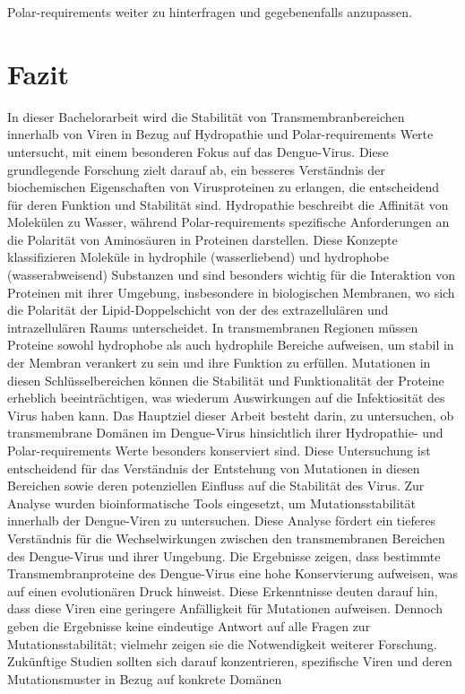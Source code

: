 \documentclass[german,version-2022-01]{uzl-thesis}
\begin{document}
Polar-requirements weiter zu hinterfragen und gegebenenfalls anzupassen.

\chapter{Fazit}


%

In dieser Bachelorarbeit wird die Stabilit\"at von Transmembranbereichen innerhalb von Viren in Bezug auf Hydropathie und Polar-requirements Werte untersucht, mit einem besonderen Fokus auf das Dengue-Virus. Diese grundlegende Forschung zielt darauf ab, ein besseres Verst\"andnis der biochemischen Eigenschaften von Virusproteinen zu erlangen, die entscheidend f\"ur deren Funktion und Stabilit\"at sind. Hydropathie beschreibt die Affinit\"at von Molek\"ulen zu Wasser, w\"ahrend Polar-requirements spezifische Anforderungen an die Polarit\"at von Aminos\"auren in Proteinen darstellen. Diese Konzepte klassifizieren Molek\"ule in hydrophile (wasserliebend) und hydrophobe (wasserabweisend) Substanzen und sind besonders wichtig f\"ur die Interaktion von Proteinen mit ihrer Umgebung, insbesondere in biologischen Membranen, wo sich die Polarit\"at der Lipid-Doppelschicht von der des extrazellul\"aren und intrazellul\"aren Raums unterscheidet. In transmembranen Regionen m\"ussen Proteine sowohl hydrophobe als auch hydrophile Bereiche aufweisen, um stabil in der Membran verankert zu sein und ihre Funktion zu erf\"ullen. Mutationen in diesen Schl\"usselbereichen k\"onnen die Stabilit\"at und Funktionalit\"at der Proteine erheblich beeintr\"achtigen, was wiederum Auswirkungen auf die Infektiosit\"at des Virus haben kann. Das Hauptziel dieser Arbeit besteht darin, zu untersuchen, ob transmembrane Dom\"anen im Dengue-Virus hinsichtlich ihrer Hydropathie- und Polar-requirements Werte besonders konserviert sind. Diese Untersuchung ist entscheidend f\"ur das Verst\"andnis der Entstehung von Mutationen in diesen Bereichen sowie deren potenziellen Einfluss auf die Stabilit\"at des Virus. Zur Analyse wurden bioinformatische Tools eingesetzt, um Mutationsstabilit\"at innerhalb der Dengue-Viren zu untersuchen. Diese Analyse f\"ordert ein tieferes Verst\"andnis f\"ur die Wechselwirkungen zwischen den transmembranen Bereichen des Dengue-Virus und ihrer Umgebung. Die Ergebnisse zeigen, dass bestimmte Transmembranproteine des Dengue-Virus eine hohe Konservierung aufweisen, was auf einen evolution\"aren Druck hinweist. Diese Erkenntnisse deuten darauf hin, dass diese Viren eine geringere Anf\"alligkeit f\"ur Mutationen aufweisen. Dennoch geben die Ergebnisse keine eindeutige Antwort auf alle Fragen zur Mutationsstabilit\"at; vielmehr zeigen sie die Notwendigkeit weiterer Forschung. Zuk\"unftige Studien sollten sich darauf konzentrieren, spezifische Viren und deren Mutationsmuster in Bezug auf konkrete Dom\"anen 
\end{document}
